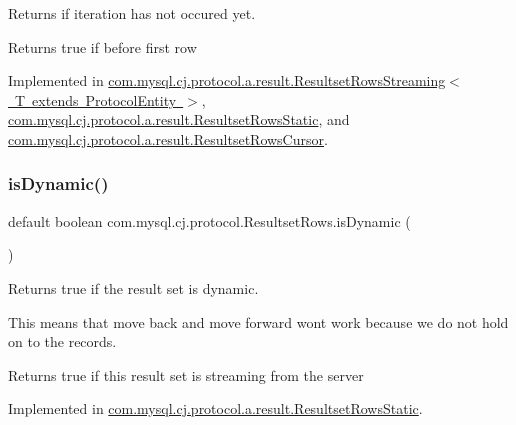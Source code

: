 Returns if iteration has not occured yet.

\begin{DoxyReturn}{Returns}
true if before first row 
\end{DoxyReturn}


Implemented in \mbox{\hyperlink{classcom_1_1mysql_1_1cj_1_1protocol_1_1a_1_1result_1_1_resultset_rows_streaming_aea0a6d7632abca3ff7a6f6d69412c011}{com.\+mysql.\+cj.\+protocol.\+a.\+result.\+Resultset\+Rows\+Streaming$<$ T extends Protocol\+Entity $>$}}, \mbox{\hyperlink{classcom_1_1mysql_1_1cj_1_1protocol_1_1a_1_1result_1_1_resultset_rows_static_adbab4e5b2490a9e147a79de4cc7d6e1d}{com.\+mysql.\+cj.\+protocol.\+a.\+result.\+Resultset\+Rows\+Static}}, and \mbox{\hyperlink{classcom_1_1mysql_1_1cj_1_1protocol_1_1a_1_1result_1_1_resultset_rows_cursor_a6ca4bec845f7589a9182c52c8f81e0c2}{com.\+mysql.\+cj.\+protocol.\+a.\+result.\+Resultset\+Rows\+Cursor}}.

\mbox{\label{interfacecom_1_1mysql_1_1cj_1_1protocol_1_1_resultset_rows_aa9dd39e935202eca58365a9f0c166db8}} 
\subsubsection{\texorpdfstring{is\+Dynamic()}{isDynamic()}}
{\footnotesize\ttfamily default boolean com.\+mysql.\+cj.\+protocol.\+Resultset\+Rows.\+is\+Dynamic (\begin{DoxyParamCaption}{ }\end{DoxyParamCaption})}

Returns true if the result set is dynamic.

This means that move back and move forward won\textquotesingle{}t work because we do not hold on to the records.

\begin{DoxyReturn}{Returns}
true if this result set is streaming from the server 
\end{DoxyReturn}


Implemented in \mbox{\hyperlink{classcom_1_1mysql_1_1cj_1_1protocol_1_1a_1_1result_1_1_resultset_rows_static_acf9221e596a879c793000246688ff8f6}{com.\+mysql.\+cj.\+protocol.\+a.\+result.\+Resultset\+Rows\+Static}}.

